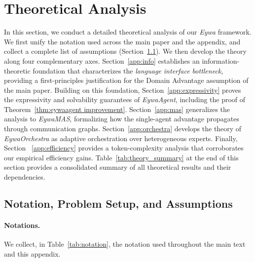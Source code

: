 \section{Theoretical Analysis}
\label{app:theory}
In this section, we conduct a detailed theoretical analysis of our \textit{Eywa} framework.
We first unify the notation used across the main paper and the appendix, and collect a complete list of assumptions (Section~\ref{app:notation}). We then develop the theory along four complementary axes. Section~\ref{app:info} establishes an information-theoretic foundation that characterizes the \emph{language interface bottleneck}, providing a first-principles justification for the Domain Advantage assumption of the main paper. Building on this foundation, Section~\ref{app:expressivity} proves the expressivity and solvability guarantees of \textit{EywaAgent}, including the proof of Theorem~\ref{thm:eywaagent improvement}. Section~\ref{app:mas} generalizes the analysis to \textit{EywaMAS}, formalizing how the single-agent advantage propagates through communication graphs. Section~\ref{app:orchestra} develops the theory of \textit{EywaOrchestra} as adaptive orchestration over heterogeneous experts.
Finally, Section ~\ref{app:efficiency} provides a token-complexity analysis that corroborates our empirical efficiency gains. Table~\ref{tab:theory_summary} at the end of this section provides a consolidated summary of all theoretical results and their dependencies.


\subsection{Notation, Problem Setup, and Assumptions}
\label{app:notation}
\paragraph{Notations.}
We collect, in Table~\ref{tab:notation}, the notation used throughout the main text and this appendix. 


